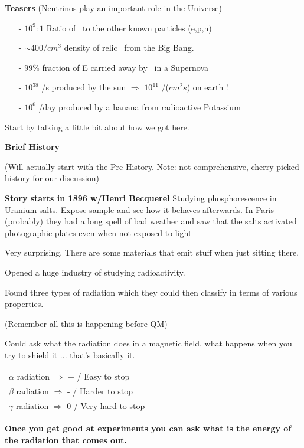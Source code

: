 {\textbf{\underline{Teasers}} (Neutrinos play an important role in the Universe)

\begin{itemize}
\item[-] $10^9:1$ Ratio of \nus\ to the other known particles (e,p,n)
\item[-] $\sim400/cm^3$ density of relic \nus\ from the Big Bang.
\item[-] $99\%$ fraction of E carried away by \nus\ in a Supernova
\item[-] $10^{38}$ \nus/s produced by the sun $\Rightarrow$ $10^{11}$ \nus/($cm^2s$) on earth !
\item[-] $10^6$ \nus/day produced by a banana from radioactive Potassium
\end{itemize}

\clearpage

Start by talking a little bit about how we got here.

\textbf{\underline{Brief History} } 

(Will actually start with the Pre-History. Note: not comprehensive, cherry-picked history for our discussion) 

\textbf{Story starts in 1896 w/Henri Becquerel}
Studying phosphorescence in Uranium salts. Expose sample and see how it behaves afterwards.  
In Paris (probably) they had a long spell of bad weather and saw that the salts activated photographic plates even when not exposed to light

Very surprising. There are some materials that emit stuff when just sitting there.

Opened a huge industry of studying radioactivity.

Found three types of radiation which they could then classify in terms of various properties. 

(Remember all this is happening before QM) 

Could ask what the radiation does in a magnetic field, what happens when you try to shield it ... that's basically it.

\begin{tabular}{l}
$\alpha$ radiation $\Rightarrow$ +  / Easy to stop\\
$\beta$ radiation $\Rightarrow$ -  / Harder to stop \\
$\gamma$ radiation $\Rightarrow$ 0 / Very hard to stop \\
\end{tabular}

\textbf{Once you get good at experiments you can ask what is the energy of the radiation that comes out.}

}
